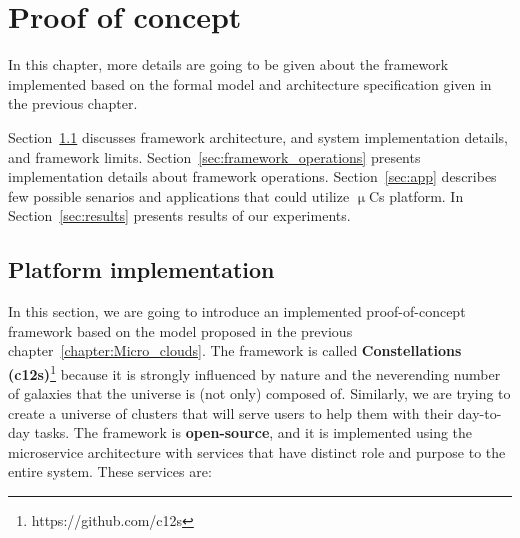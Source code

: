 \chapter{Proof of concept}\label{chapter:Implementation}
%
In this chapter, more details are going to be given about the framework implemented based on the formal model and architecture specification given in the previous chapter.

Section~\ref{sec:framework} discusses framework architecture, and system implementation details, and framework limits. Section~\ref{sec:framework_operations} presents implementation details about framework operations. Section~\ref{sec:app} describes few possible senarios and applications that could utilize $\upmu$Cs platform. In Section~\ref{sec:results} presents results of our experiments.
%
%
\section{Platform implementation}\label{sec:framework}
%
In this section, we are going to introduce an implemented proof-of-concept framework based on the model proposed in the previous chapter~\ref{chapter:Micro_clouds}. The framework is called \textbf{Constellations (c12s)}\footnote{https://github.com/c12s} because it is strongly influenced by nature and the neverending number of galaxies that the universe is (not only) composed of. Similarly, we are trying to create a universe of clusters that will serve users to help them with their day-to-day tasks. The framework is \textbf{open-source}, and it is implemented using the microservice architecture with services that have distinct role and purpose to the entire system. These services are:

